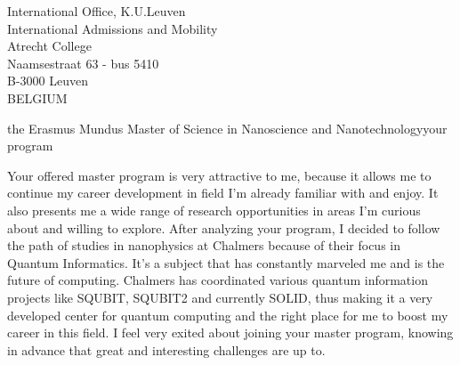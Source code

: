 \documentclass[12pt]{letter}
\begin{document}
\begin{letter}{International Office, K.U.Leuven\\
International Admissions and Mobility\\
Atrecht College\\
Naamsestraat 63 - bus 5410\\
B-3000 Leuven\\
BELGIUM}

\begin{content}{the Erasmus Mundus Master of Science in Nanoscience and Nanotechnology}{your program}

Your offered master program is very attractive to me, because it allows me to continue
my career development in field I'm already familiar with and enjoy. It also presents me
a wide range of research opportunities in areas I'm curious about and willing to explore.
After analyzing your program, I decided to follow the path of studies in nanophysics at
Chalmers because of their focus in Quantum Informatics. It's a subject that has constantly
marveled me and is the future of computing. Chalmers has coordinated various quantum
information projects like SQUBIT, SQUBIT2 and currently SOLID, thus making it a very developed center for quantum computing and the right place for me to boost my career in this field.
I feel very exited about joining your master program, knowing in advance that great and
interesting challenges are up to.

\end{content}

\end{letter}
\end{document}

